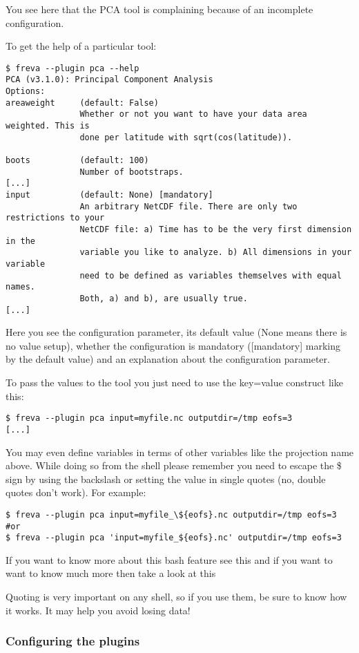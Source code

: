 \documentclass[a4paper,11pt]{ltxdoc}
\begin{document}
You see here that the PCA tool is complaining because of an incomplete configuration.

To get the help of a particular tool:
\begin{lstlisting}
$ freva --plugin pca --help
PCA (v3.1.0): Principal Component Analysis
Options:
areaweight     (default: False)
               Whether or not you want to have your data area weighted. This is
               done per latitude with sqrt(cos(latitude)).

boots          (default: 100)
               Number of bootstraps.
[...]
input          (default: None) [mandatory]
               An arbitrary NetCDF file. There are only two restrictions to your
               NetCDF file: a) Time has to be the very first dimension in the
               variable you like to analyze. b) All dimensions in your variable
               need to be defined as variables themselves with equal names.
               Both, a) and b), are usually true.
[...]
\end{lstlisting}

Here you see the configuration parameter, its default value (None means there is no value setup), whether the configuration is mandatory ([mandatory] marking by the default value) and an explanation about the configuration parameter.

To pass the values to the tool you just need to use the key=value construct like this:
\begin{lstlisting}
$ freva --plugin pca input=myfile.nc outputdir=/tmp eofs=3
[...]
\end{lstlisting}

You may even define variables in terms of other variables like the projection name above. While doing so from the shell please remember you need to escape the \$ sign by using the backslash or setting the value in single quotes (no, double quotes don't work). For example:
\begin{lstlisting}
$ freva --plugin pca input=myfile_\${eofs}.nc outputdir=/tmp eofs=3
#or
$ freva --plugin pca 'input=myfile_${eofs}.nc' outputdir=/tmp eofs=3
\end{lstlisting}
If you want to know more about this bash feature see this and if you want to want to know much more then take a look at this

Quoting is very important on any shell, so if you use them, be sure to know how it works. It may help you avoid losing data!

\subsubsection*{Configuring the plugins}
\end{document}
